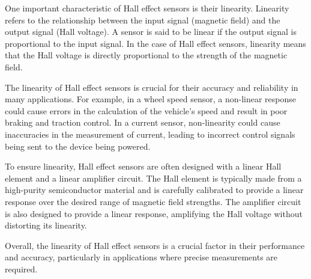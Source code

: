 \documentclass[11pt]{article}
\begin{document}
One important characteristic of Hall effect sensors is their linearity. Linearity refers to the relationship between the input signal (magnetic field) and the output signal (Hall voltage). A sensor is said to be linear if the output signal is proportional to the input signal. In the case of Hall effect sensors, linearity means that the Hall voltage is directly proportional to the strength of the magnetic field.

The linearity of Hall effect sensors is crucial for their accuracy and reliability in many applications. For example, in a wheel speed sensor, a non-linear response could cause errors in the calculation of the vehicle's speed and result in poor braking and traction control. In a current sensor, non-linearity could cause inaccuracies in the measurement of current, leading to incorrect control signals being sent to the device being powered.

To ensure linearity, Hall effect sensors are often designed with a linear Hall element and a linear amplifier circuit. The Hall element is typically made from a high-purity semiconductor material and is carefully calibrated to provide a linear response over the desired range of magnetic field strengths. The amplifier circuit is also designed to provide a linear response, amplifying the Hall voltage without distorting its linearity.

Overall, the linearity of Hall effect sensors is a crucial factor in their performance and accuracy, particularly in applications where precise measurements are required.
\end{document}
